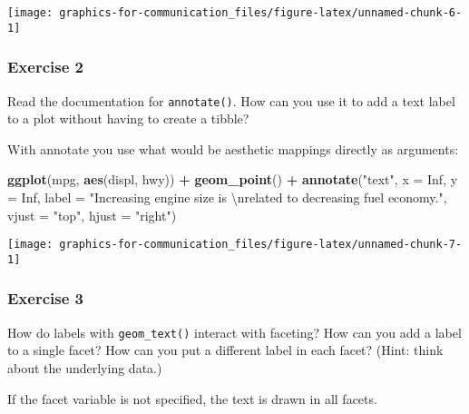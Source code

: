 \documentclass[]{book}
\newenvironment{Shaded}{\begin{snugshade}}{\end{snugshade}}
\newcommand{\CharTok}[1]{\textcolor[rgb]{0.31,0.60,0.02}{#1}}
\newcommand{\DataTypeTok}[1]{\textcolor[rgb]{0.13,0.29,0.53}{#1}}
\newcommand{\KeywordTok}[1]{\textcolor[rgb]{0.13,0.29,0.53}{\textbf{#1}}}
\newcommand{\NormalTok}[1]{#1}
\newcommand{\OperatorTok}[1]{\textcolor[rgb]{0.81,0.36,0.00}{\textbf{#1}}}
\newcommand{\OtherTok}[1]{\textcolor[rgb]{0.56,0.35,0.01}{#1}}
\newcommand{\StringTok}[1]{\textcolor[rgb]{0.31,0.60,0.02}{#1}}
\theoremstyle{definition}
\theoremstyle{definition}
\theoremstyle{definition}
\theoremstyle{remark}
\begin{document}
\begin{center}\texttt{[image: graphics-for-communication\_files/figure-latex/unnamed-chunk-6-1]} \end{center}

\hypertarget{exercise-2-67}{%
\subsubsection{Exercise 2}\label{exercise-2-67}}

Read the documentation for \texttt{annotate()}. How can you use it to
add a text label to a plot without having to create a tibble?

With annotate you use what would be aesthetic mappings directly as
arguments:

\begin{Shaded}
\begin{Highlighting}[]
\KeywordTok{ggplot}\NormalTok{(mpg, }\KeywordTok{aes}\NormalTok{(displ, hwy)) }\OperatorTok{+}
\StringTok{  }\KeywordTok{geom_point}\NormalTok{() }\OperatorTok{+}
\StringTok{  }\KeywordTok{annotate}\NormalTok{(}\StringTok{"text"}\NormalTok{, }\DataTypeTok{x =} \OtherTok{Inf}\NormalTok{, }\DataTypeTok{y =} \OtherTok{Inf}\NormalTok{, }
           \DataTypeTok{label =} \StringTok{"Increasing engine size is }\CharTok{\textbackslash{}n}\StringTok{related to decreasing fuel economy."}\NormalTok{, }\DataTypeTok{vjust =} \StringTok{"top"}\NormalTok{, }\DataTypeTok{hjust =} \StringTok{"right"}\NormalTok{)}
\end{Highlighting}
\end{Shaded}

\begin{center}\texttt{[image: graphics-for-communication\_files/figure-latex/unnamed-chunk-7-1]} \end{center}

\hypertarget{exercise-3-53}{%
\subsubsection{Exercise 3}\label{exercise-3-53}}

How do labels with \texttt{geom\_text()} interact with faceting? How can
you add a label to a single facet? How can you put a different label in
each facet? (Hint: think about the underlying data.)

If the facet variable is not specified, the text is drawn in all facets.
\end{document}
